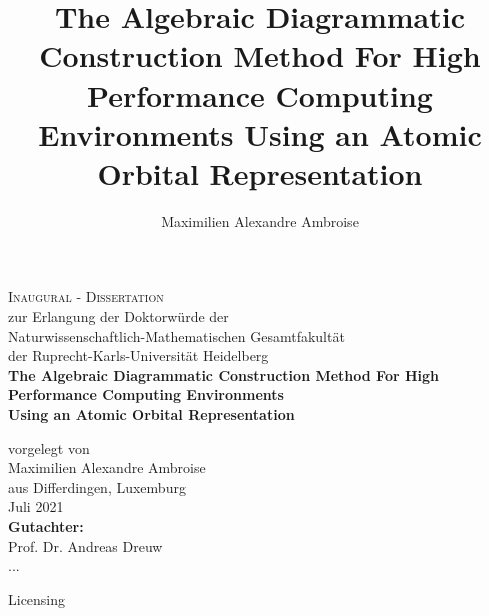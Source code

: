 \documentclass[a4paper,12pt]{report}
\begin{document}
\author{Maximilien Alexandre Ambroise}
\title{The Algebraic Diagrammatic Construction Method For High Performance Computing Environments Using an Atomic Orbital Representation}

\begin{titlepage}
\begin{center}
{\Huge\scshape Inaugural - Dissertation \\}
{ zur Erlangung der Doktorwürde der \\
Naturwissenschaftlich-Mathematischen Gesamtfakultät \\
der Ruprecht-Karls-Universität Heidelberg \\}
\vspace{1cm}
{\huge\bfseries The Algebraic Diagrammatic Construction Method For High Performance Computing Environments \\}
{\Large\bfseries Using an Atomic Orbital Representation \\}
 
\vspace{1.5cm}
{vorgelegt von\\}
\vspace*{1.5cm}
{\Large Maximilien Alexandre Ambroise}\\
{\large aus Differdingen, Luxemburg}\\
\vspace{2cm}
{Juli 2021} \\[5pt]
\vspace{2cm}
{\bfseries Gutachter: \\}
{Prof. Dr. Andreas Dreuw \\ ...}\\
\end{center}
\end{titlepage}


\newpage

Licensing

\newpage

\newpage

\end{document}

